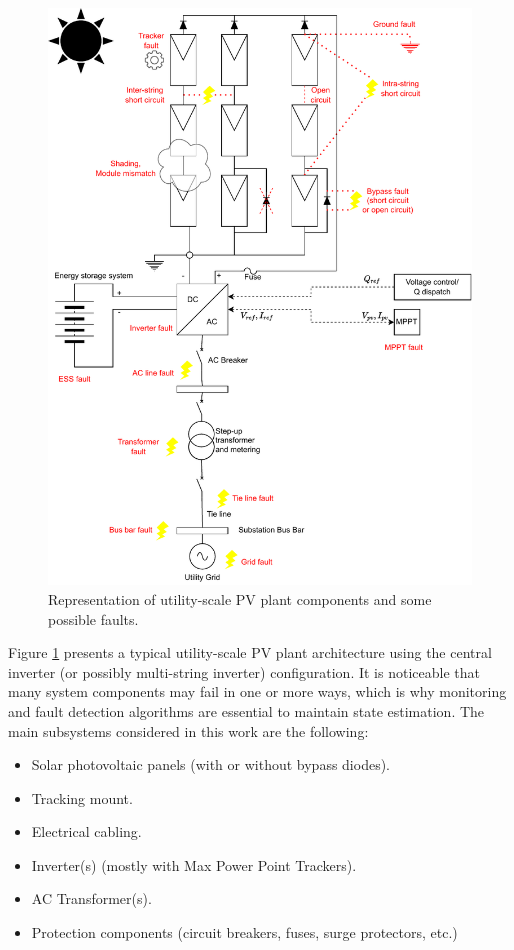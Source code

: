 \begin{figure}[h!]
    \centering
    \includegraphics[width=15cm]{figures/chapter2/pvplant.drawio.pdf}
    \caption{Representation of utility-scale PV plant components and some possible faults.}
    \label{fig:topologies}
\end{figure}

Figure \ref{fig:topologies} presents a typical utility-scale PV plant architecture using the central inverter (or possibly multi-string inverter) configuration. It is noticeable that many system components may fail in one or more ways, which is why monitoring and fault detection algorithms are essential to maintain state estimation. The main subsystems considered in this work are the following:

\begin{itemize}
    \item Solar photovoltaic panels (with or without bypass diodes).
    \item Tracking mount.
    \item Electrical cabling.
    \item Inverter(s) (mostly with Max Power Point Trackers).
    \item AC Transformer(s).
    \item Protection components (circuit breakers, fuses, surge protectors,
    etc.)
\end{itemize}

